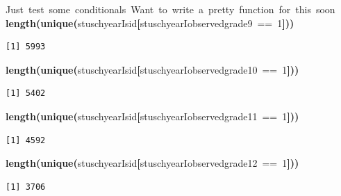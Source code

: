 \documentclass[12pt]{article}
\makeatletter
\newcommand{\hlnumber}[1]{\textcolor[rgb]{0,0,0}{#1}}%
\newcommand{\hlfunctioncall}[1]{\textcolor[rgb]{0.501960784313725,0,0.329411764705882}{\textbf{#1}}}%
\newcommand{\hlkeyword}[1]{\textcolor[rgb]{0,0,0}{\textbf{#1}}}%
\newcommand{\hlcomment}[1]{\textcolor[rgb]{0.180392156862745,0.6,0.341176470588235}{#1}}%
\newcommand{\hlsymbol}[1]{\textcolor[rgb]{0,0,0}{#1}}%
\newcommand{\hlstd}[1]{\textcolor[rgb]{0,0,0}{#1}}%
\newenvironment{kframe}{%
 \def\FrameCommand##1{\hskip\@totalleftmargin \hskip-\fboxsep
 \colorbox{shadecolor}{##1}\hskip-\fboxsep
     \hskip-\linewidth \hskip-\@totalleftmargin \hskip\columnwidth}%
 \MakeFramed {\advance\hsize-\width
   \@totalleftmargin\z@ \linewidth\hsize
   \@setminipage}}%
 {\par\unskip\endMakeFramed}
\newenvironment{knitrout}{}{} %
\renewenvironment{knitrout}{\begin{footnotesize}}{\end{footnotesize}}
\makeatother
\begin{document}
\begin{knitrout}
\color{fgcolor}\begin{kframe}
\begin{flushleft}
\ttfamily\noindent
\hlcomment{\usebox{\hlnormalsizeboxhash}{\ }Just{\ }test{\ }some{\ }conditionals{\ }Want{\ }to{\ }write{\ }a{\ }pretty{\ }function{\ }for{\ }this{\ }soon}\hspace*{\fill}\\
\hlstd{}\hlfunctioncall{length}\hlkeyword{(}\hlfunctioncall{unique}\hlkeyword{(}\hlsymbol{stuschyearI}\hlkeyword{\usebox{\hlnormalsizeboxdollar}}\hlsymbol{sid}\hlkeyword{[}\hlsymbol{stuschyearI}\hlkeyword{\usebox{\hlnormalsizeboxdollar}}\hlsymbol{observed\usebox{\hlnormalsizeboxunderscore}grade\usebox{\hlnormalsizeboxunderscore}9}{\ }=={\ }\hlnumber{1}\hlkeyword{]}\hlkeyword{)}\hlkeyword{)}\mbox{}
\normalfont
\end{flushleft}
\begin{verbatim}
[1] 5993
\end{verbatim}
\begin{flushleft}
\ttfamily\noindent
\hlfunctioncall{length}\hlkeyword{(}\hlfunctioncall{unique}\hlkeyword{(}\hlsymbol{stuschyearI}\hlkeyword{\usebox{\hlnormalsizeboxdollar}}\hlsymbol{sid}\hlkeyword{[}\hlsymbol{stuschyearI}\hlkeyword{\usebox{\hlnormalsizeboxdollar}}\hlsymbol{observed\usebox{\hlnormalsizeboxunderscore}grade\usebox{\hlnormalsizeboxunderscore}10}{\ }=={\ }\hlnumber{1}\hlkeyword{]}\hlkeyword{)}\hlkeyword{)}\mbox{}
\normalfont
\end{flushleft}
\begin{verbatim}
[1] 5402
\end{verbatim}
\begin{flushleft}
\ttfamily\noindent
\hlfunctioncall{length}\hlkeyword{(}\hlfunctioncall{unique}\hlkeyword{(}\hlsymbol{stuschyearI}\hlkeyword{\usebox{\hlnormalsizeboxdollar}}\hlsymbol{sid}\hlkeyword{[}\hlsymbol{stuschyearI}\hlkeyword{\usebox{\hlnormalsizeboxdollar}}\hlsymbol{observed\usebox{\hlnormalsizeboxunderscore}grade\usebox{\hlnormalsizeboxunderscore}11}{\ }=={\ }\hlnumber{1}\hlkeyword{]}\hlkeyword{)}\hlkeyword{)}\mbox{}
\normalfont
\end{flushleft}
\begin{verbatim}
[1] 4592
\end{verbatim}
\begin{flushleft}
\ttfamily\noindent
\hlfunctioncall{length}\hlkeyword{(}\hlfunctioncall{unique}\hlkeyword{(}\hlsymbol{stuschyearI}\hlkeyword{\usebox{\hlnormalsizeboxdollar}}\hlsymbol{sid}\hlkeyword{[}\hlsymbol{stuschyearI}\hlkeyword{\usebox{\hlnormalsizeboxdollar}}\hlsymbol{observed\usebox{\hlnormalsizeboxunderscore}grade\usebox{\hlnormalsizeboxunderscore}12}{\ }=={\ }\hlnumber{1}\hlkeyword{]}\hlkeyword{)}\hlkeyword{)}\mbox{}
\normalfont
\end{flushleft}
\begin{verbatim}
[1] 3706
\end{verbatim}
\end{kframe}
\end{knitrout}
\end{document}
